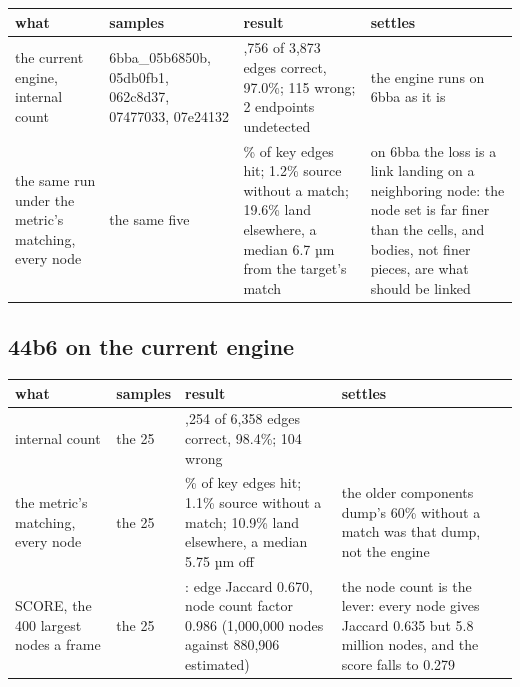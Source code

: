 {\footnotesize
\setlength{\tabcolsep}{6pt}
\begin{longtable}{>{\RaggedRight\arraybackslash}p{}>{\RaggedRight\arraybackslash}p{}>{\RaggedRight\arraybackslash}p{}>{\RaggedRight\arraybackslash}p{}}
\toprule
what & samples & result & settles \\
\midrule
\endhead
the current engine, internal count & 6bba\_\allowbreak{}05b6850b, 05db0fb1, 062c8d37, 07477033, 07e24132 & 3,756 of 3,873 edges correct, 97.0\%; 115 wrong; 2 endpoints undetected & the engine runs on 6bba as it is \\
the same run under the metric's matching, every node & the same five & 78.5\% of key edges hit; 1.2\% source without a match; 19.6\% land elsewhere, a median 6.7 µm from the target's match & on 6bba the loss is a link landing on a neighboring node: the node set is far finer than the cells, and bodies, not finer pieces, are what should be linked \\
\bottomrule
\end{longtable}
}

\subsection{\texorpdfstring{44b6 on the current engine}{44b6 on the current engine}}

{\footnotesize
\setlength{\tabcolsep}{6pt}
\begin{longtable}{>{\RaggedRight\arraybackslash}p{}>{\RaggedRight\arraybackslash}p{}>{\RaggedRight\arraybackslash}p{}>{\RaggedRight\arraybackslash}p{}}
\toprule
what & samples & result & settles \\
\midrule
\endhead
internal count & the 25 & 6,254 of 6,358 edges correct, 98.4\%; 104 wrong &  \\
the metric's matching, every node & the 25 & 87.1\% of key edges hit; 1.1\% source without a match; 10.9\% land elsewhere, a median 5.75 µm off & the older components dump's 60\% without a match was that dump, not the engine \\
SCORE, the 400 largest nodes a frame & the 25 & 0.661: edge Jaccard 0.670, node count factor 0.986 (1,000,000 nodes against 880,906 estimated) & the node count is the lever: every node gives Jaccard 0.635 but 5.8 million nodes, and the score falls to 0.279 \\
\bottomrule
\end{longtable}
}

